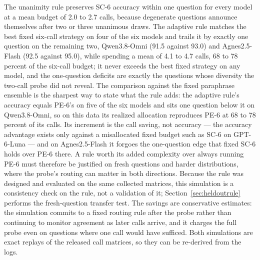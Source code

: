 The unanimity rule preserves SC-6 accuracy within one question for every model at a mean budget of 2.0 to 2.7 calls, because degenerate questions announce themselves after two or three unanimous draws. The adaptive rule matches the best fixed six-call strategy on four of the six models and trails it by exactly one question on the remaining two, Qwen3.8-Omni (91.5 against 93.0) and Agnes2.5-Flash (92.5 against 95.0), while spending a mean of 4.1 to 4.7 calls, 68 to 78 percent of the six-call budget; it never exceeds the best fixed strategy on any model, and the one-question deficits are exactly the questions whose diversity the two-call probe did not reveal. The comparison against the fixed paraphrase ensemble is the sharpest way to state what the rule adds: the adaptive rule's accuracy equals PE-6's on five of the six models and sits one question below it on Qwen3.8-Omni, so on this data its realized allocation reproduces PE-6 at 68 to 78 percent of its calls. Its increment is the call saving, not accuracy --- the accuracy advantage exists only against a misallocated fixed budget such as SC-6 on GPT-6-Luna --- and on Agnes2.5-Flash it forgoes the one-question edge that fixed SC-6 holds over PE-6 there. A rule worth its added complexity over always running PE-6 must therefore be justified on fresh questions and harder distributions, where the probe's routing can matter in both directions. Because the rule was designed and evaluated on the same collected matrices, this simulation is a consistency check on the rule, not a validation of it; Section~\ref{sec:heldoutrule} performs the fresh-question transfer test. The savings are conservative estimates: the simulation commits to a fixed routing rule after the probe rather than continuing to monitor agreement as later calls arrive, and it charges the full probe even on questions where one call would have sufficed. Both simulations are exact replays of the released call matrices, so they can be re-derived from the logs.

